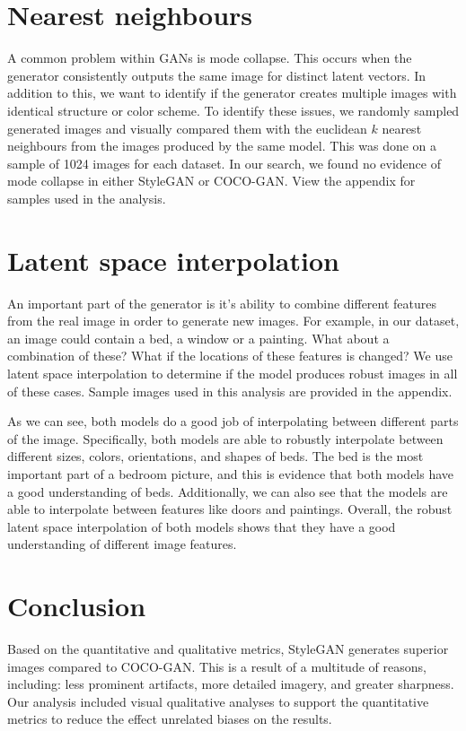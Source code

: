 \documentclass{article}
\begin{document}
          \section{Nearest neighbours}
        \label{subsec:nearestneighbours}
        A common problem within GANs is mode collapse.
        This occurs when the generator consistently outputs the same image for distinct latent vectors.
        In addition to this, we want to identify if the generator creates multiple images with identical structure or color scheme.
        To identify these issues, we randomly sampled generated images and visually compared them with the euclidean $k$ nearest neighbours from the images produced by the same model. This was done on a sample of 1024 images for each dataset.
        In our search, we found no evidence of mode collapse in either StyleGAN or COCO-GAN. View the appendix for samples used in the analysis.
        
         \section{Latent space interpolation}
         An important part of the generator is it's ability to combine different features from the real image in order to generate new images.
        For example, in our dataset, an image could contain a bed, a window or a painting. What about a combination of these?
        What if the locations of these features is changed? We use latent space interpolation to determine if the model produces robust images in all of these cases. Sample images used in this analysis are provided in the appendix.
        
         As we can see, both models do a good job of interpolating between different parts of the image. Specifically, both models are able to robustly interpolate between different sizes, colors, orientations, and shapes of beds. The bed is the most important part of a bedroom picture, and this is evidence that both models have a good understanding of beds. Additionally, we can also see that the models are able to interpolate between features like doors and paintings. Overall, the robust latent space interpolation of both models shows that they have a good understanding of different image features.
        
    
        \section{Conclusion}
        Based on the quantitative and qualitative metrics, StyleGAN generates superior images compared to COCO-GAN.
        This is a result of a multitude of reasons, including: less prominent artifacts, more detailed imagery, and greater sharpness.
        Our analysis included visual qualitative analyses to support the quantitative metrics to reduce the effect unrelated biases on the results.
        
\end{document}
